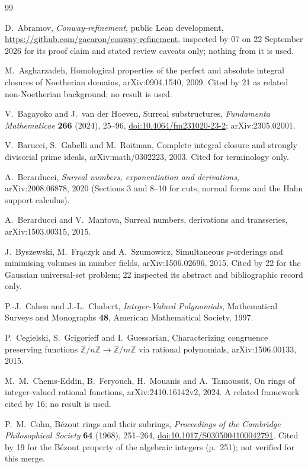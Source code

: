 \documentclass[11pt,letterpaper]{article}
\numberwithin{equation}{section}
\theoremstyle{definition}
\theoremstyle{remark}
\theoremstyle{plain}
\newcommand{\Z}{\mathbb Z}
\begin{document}
\begingroup
\raggedright
\small
\begin{thebibliography}{99}

D.~Abramov, \emph{Conway-refinement}, public Lean development,
\url{https://github.com/gaearon/conway-refinement}, inspected by 07 on 22 September 2026 for its
proof claim and stated review caveats only; nothing from it is used.

M.~Asgharzadeh, Homological properties of the perfect and absolute integral closures of Noetherian domains, arXiv:0904.1540, 2009.
Cited by 21 as related non-Noetherian background; no result is used.

V.~Bagayoko and J.~van der Hoeven, Surreal substructures, \emph{Fundamenta Mathematicae}
\textbf{266} (2024), 25--96, \href{https://doi.org/10.4064/fm231020-23-2}{doi:10.4064/fm231020-23-2};
arXiv:2305.02001.

V.~Barucci, S.~Gabelli and M.~Roitman, Complete integral closure and strongly divisorial prime
ideals, arXiv:math/0302223, 2003. Cited for terminology only.

A.~Berarducci, \emph{Surreal numbers, exponentiation and derivations}, arXiv:2008.06878, 2020
(Sections 3 and 8--10 for cuts, normal forms and the Hahn support calculus).

A.~Berarducci and V.~Mantova, Surreal numbers, derivations and transseries, arXiv:1503.00315, 2015.

J.~Byszewski, M.~Fr\k aczyk and A.~Szumowicz, Simultaneous $p$-orderings and minimising volumes in number fields, arXiv:1506.02696, 2015.
Cited by 22 for the Gaussian universal-set problem; 22 inspected its abstract and bibliographic record only.

P.-J.~Cahen and J.-L.~Chabert, \emph{Integer-Valued Polynomials}, Mathematical Surveys and
Monographs \textbf{48}, American Mathematical Society, 1997.

P.~Cegielski, S.~Grigorieff and I.~Guessarian, Characterizing congruence preserving functions
$\Z/n\Z\to\Z/m\Z$ via rational polynomials, arXiv:1506.00133, 2015.

M.~M.~Chems-Eddin, B.~Feryouch, H.~Mouanis and A.~Tamoussit, On rings of integer-valued rational
functions, arXiv:2410.16142v2, 2024. A related framework cited by 16; no result is used.

P.~M.~Cohn, B\'ezout rings and their subrings, \emph{Proceedings of the Cambridge Philosophical Society} \textbf{64} (1968),
251--264, \href{https://doi.org/10.1017/S0305004100042791}{doi:10.1017/S0305004100042791}. Cited by 19 for the B\'ezout property of the
algebraic integers (p.~251); not verified for this merge.


\end{thebibliography}
\end{document}
